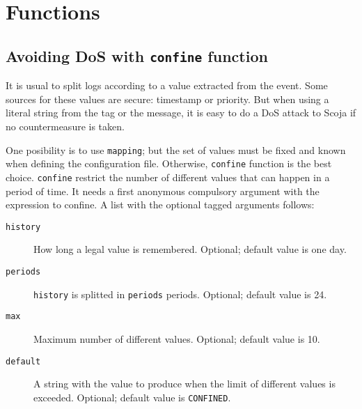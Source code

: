 
\section{Functions}


\subsection{Avoiding DoS with {\tt confine} function}
It is usual to split logs according to a value extracted from the
event.
Some sources for these values are secure: timestamp or priority.
But when using a literal string from the tag or the message, it is
easy to do a DoS attack to Scoja if no countermeasure is taken.

One posibility is to use {\tt mapping}; but the set of values must be
fixed and known when defining the configuration file.
Otherwise, {\tt confine} function is the best choice.
{\tt confine} restrict the number of different values that can happen
in a period of time.
It needs a first anonymous compulsory argument with the expression to confine.
A list with the optional tagged arguments follows:
\begin{description}
  \item[{\tt history}]
    How long a legal value is remembered.
    Optional; default value is one day.
  \item[{\tt periods}]
    {\tt history} is splitted in {\tt periods} periods.
    Optional; default value is 24.
  \item[{\tt max}]
    Maximum number of different values.
    Optional; default value is 10.
  \item[{\tt default}]
    A string with the value to produce when the limit of different
    values is exceeded.
    Optional; default value is {\tt CONFINED}.
\end{description}
